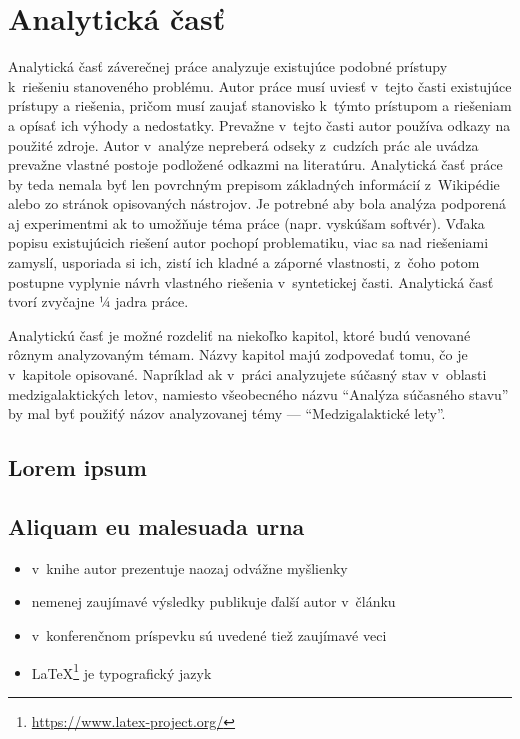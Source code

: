 
\chapter{Analytická časť}

Analytická časť záverečnej práce analyzuje existujúce podobné prístupy k~riešeniu stanoveného problému. Autor práce musí uviesť v~tejto časti existujúce prístupy a riešenia, pričom musí zaujať stanovisko k~týmto prístupom a riešeniam a opísať ich výhody a nedostatky. Prevažne v~tejto časti autor používa odkazy na použité zdroje. Autor v~analýze nepreberá odseky z~cudzích prác ale uvádza prevažne vlastné postoje podložené odkazmi na literatúru. Analytická časť práce by teda nemala byť len povrchným prepisom základných informácií z~Wikipédie alebo zo stránok opisovaných nástrojov. Je potrebné aby bola analýza podporená aj experimentmi ak to umožňuje téma práce (napr. vyskúšam softvér). Vďaka popisu existujúcich riešení autor pochopí problematiku, viac sa nad riešeniami zamyslí, usporiada si ich, zistí ich kladné a záporné vlastnosti, z~čoho potom postupne vyplynie návrh vlastného riešenia v~syntetickej časti. Analytická časť tvorí zvyčajne ¼ jadra práce.

Analytickú časť je možné rozdeliť na niekoľko kapitol, ktoré budú venované rôznym analyzovaným témam. Názvy kapitol majú zodpovedať tomu, čo je v~kapitole opisované. Napríklad ak v~práci analyzujete súčasný stav v~oblasti medzigalaktických letov, namiesto všeobecného názvu "`Analýza súčasného stavu"' by mal byť použiťý názov analyzovanej témy --- "`Medzigalaktické lety"'.

\section{Lorem ipsum}
\blindtext

\section{Aliquam eu malesuada urna}
\blindtext
\begin{itemize}
    \item v~knihe \cite{book} autor prezentuje naozaj odvážne myšlienky
    \item nemenej zaujímavé výsledky publikuje ďalší autor v~článku \cite{article} 
    \item v~konferenčnom príspevku \cite{conference} sú uvedené tiež zaujímavé veci
    \item \LaTeX{}\footnote{\url{https://www.latex-project.org/}} je typografický jazyk
\end{itemize}

